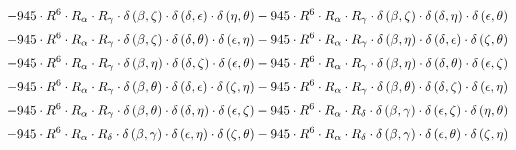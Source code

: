 \begin{subequations}
\begin{gather}
 \\[0.2em] \notag 		 - 945 \cdot R^{6} \cdot R_{\alpha{}} \cdot R_{\gamma{}} \cdot \delta{}\left(\beta{}, \zeta{}\right) \cdot \delta{}\left(\delta{}, \epsilon{}\right) \cdot \delta{}\left(\eta{}, \theta{}\right)- 945 \cdot R^{6} \cdot R_{\alpha{}} \cdot R_{\gamma{}} \cdot \delta{}\left(\beta{}, \zeta{}\right) \cdot \delta{}\left(\delta{}, \eta{}\right) \cdot \delta{}\left(\epsilon{}, \theta{}\right) 
 \\[0.2em] \notag 		 - 945 \cdot R^{6} \cdot R_{\alpha{}} \cdot R_{\gamma{}} \cdot \delta{}\left(\beta{}, \zeta{}\right) \cdot \delta{}\left(\delta{}, \theta{}\right) \cdot \delta{}\left(\epsilon{}, \eta{}\right)- 945 \cdot R^{6} \cdot R_{\alpha{}} \cdot R_{\gamma{}} \cdot \delta{}\left(\beta{}, \eta{}\right) \cdot \delta{}\left(\delta{}, \epsilon{}\right) \cdot \delta{}\left(\zeta{}, \theta{}\right) 
 \\[0.2em] \notag 		 - 945 \cdot R^{6} \cdot R_{\alpha{}} \cdot R_{\gamma{}} \cdot \delta{}\left(\beta{}, \eta{}\right) \cdot \delta{}\left(\delta{}, \zeta{}\right) \cdot \delta{}\left(\epsilon{}, \theta{}\right)- 945 \cdot R^{6} \cdot R_{\alpha{}} \cdot R_{\gamma{}} \cdot \delta{}\left(\beta{}, \eta{}\right) \cdot \delta{}\left(\delta{}, \theta{}\right) \cdot \delta{}\left(\epsilon{}, \zeta{}\right) 
 \\[0.2em] \notag 		 - 945 \cdot R^{6} \cdot R_{\alpha{}} \cdot R_{\gamma{}} \cdot \delta{}\left(\beta{}, \theta{}\right) \cdot \delta{}\left(\delta{}, \epsilon{}\right) \cdot \delta{}\left(\zeta{}, \eta{}\right)- 945 \cdot R^{6} \cdot R_{\alpha{}} \cdot R_{\gamma{}} \cdot \delta{}\left(\beta{}, \theta{}\right) \cdot \delta{}\left(\delta{}, \zeta{}\right) \cdot \delta{}\left(\epsilon{}, \eta{}\right) 
 \\[0.2em] \notag 		 - 945 \cdot R^{6} \cdot R_{\alpha{}} \cdot R_{\gamma{}} \cdot \delta{}\left(\beta{}, \theta{}\right) \cdot \delta{}\left(\delta{}, \eta{}\right) \cdot \delta{}\left(\epsilon{}, \zeta{}\right)- 945 \cdot R^{6} \cdot R_{\alpha{}} \cdot R_{\delta{}} \cdot \delta{}\left(\beta{}, \gamma{}\right) \cdot \delta{}\left(\epsilon{}, \zeta{}\right) \cdot \delta{}\left(\eta{}, \theta{}\right) 
 \\[0.2em] \notag 		 - 945 \cdot R^{6} \cdot R_{\alpha{}} \cdot R_{\delta{}} \cdot \delta{}\left(\beta{}, \gamma{}\right) \cdot \delta{}\left(\epsilon{}, \eta{}\right) \cdot \delta{}\left(\zeta{}, \theta{}\right)- 945 \cdot R^{6} \cdot R_{\alpha{}} \cdot R_{\delta{}} \cdot \delta{}\left(\beta{}, \gamma{}\right) \cdot \delta{}\left(\epsilon{}, \theta{}\right) \cdot \delta{}\left(\zeta{}, \eta{}\right) 

\end{gather}
\end{subequations}
